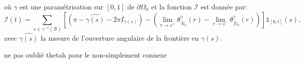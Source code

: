 où $\gamma$ est une paramétrisation sur $[0, 1]$ de $\partial\Omega_h$ et la fonction $\mathcal{I}$ est donnée par:
$$
\mathcal{I}(t)=\displaystyle\sum_{s\in\gamma^{-1}(\mathcal{B})}\left[\left(\pi-\widehat{\gamma(s)}-2\pi I_{\gamma(s)}\right)-\left(\displaystyle\lim\limits_{r\rightarrow s^+}\theta^{\gamma}_{\bar{N}_h}(r) - \lim\limits_{r\rightarrow s^-}\theta^{\gamma}_{\bar{N}_h}(r)\right)\right]\mathbb{1}_{[0, t]}(s),
$$
avec $\widehat{\gamma(s)}$ la mesure de l'ouverture angulaire de la frontière en $\gamma(s)$.

ne pas oublié thetah pour le non-simplement connexe

